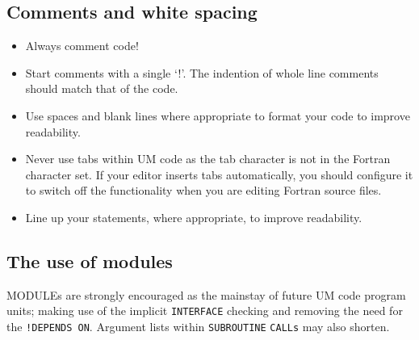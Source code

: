 \begin{itemize}
\end{itemize}

\subsection{Comments and white spacing}\label{sec:comments}
\begin{itemize}
\item Always comment code!
\item Start comments with a single `!'.  The indention of whole line comments
should match that of the code.
\item Use spaces and blank lines where appropriate to format
your code to improve readability.
\item Never use tabs within UM code as the tab character is not in
the Fortran character set. If your editor inserts tabs automatically,
you should configure it to switch off the functionality when
you are editing Fortran source files.
\item Line up your statements, where appropriate,
to improve readability.
\end{itemize}

\subsection{The use of modules}\label{sec:modules}
MODULEs are strongly encouraged as
the mainstay of future UM code program units; making use of the implicit
\verb|INTERFACE| checking and removing the need for the \verb|!DEPENDS ON|.
Argument lists within  \verb|SUBROUTINE| \verb|CALLs| may also shorten.

